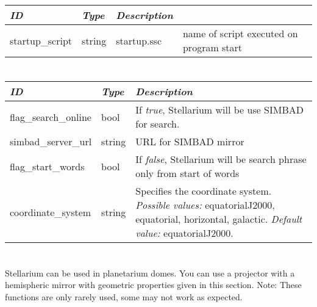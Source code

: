 \section{}\label{sec:config.ini:scripts}

\begin{longtabu} to \textwidth {l|l|X}\toprule
\emph{ID}                  & \emph{Type} & \emph{Description}\\\midrule
startup\_script                & string & startup.ssc & name of script executed on program start\\\bottomrule 
\end{longtabu}

\section{}\label{sec:config.ini:search}

\begin{longtabu} to \textwidth {l|l|X}\toprule
\emph{ID} & \emph{Type} & \emph{Description}\\\midrule
flag\_search\_online & bool   & If \emph{true}, Stellarium will be use SIMBAD for search.\\\midrule
simbad\_server\_url  & string & URL for SIMBAD mirror\\\midrule
flag\_start\_words   & bool   & If \emph{false}, Stellarium will be search phrase only from start of words\\\midrule
coordinate\_system   & string & Specifies the coordinate system. 
                                \emph{Possible values:} equatorialJ2000, equatorial, horizontal, galactic. \emph{Default value:} equatorialJ2000.\\
\bottomrule
\end{longtabu}

\section{}\label{sec:config.ini:spheric_mirror}

Stellarium can be used in planetarium domes. You can use a projector with a hemispheric mirror with geometric properties given in this section. 
Note: These functions are only rarely used, some may not work as expected.
 

